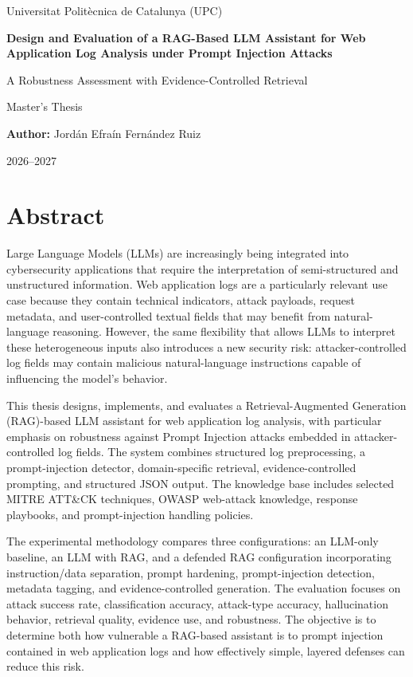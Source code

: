 \documentclass[12pt,a4paper,oneside]{report}
\newcommand{\thesistitle}{Design and Evaluation of a RAG-Based LLM Assistant for Web Application Log Analysis under Prompt Injection Attacks}
\newcommand{\thesissubtitle}{A Robustness Assessment with Evidence-Controlled Retrieval}
\newcommand{\thesisauthor}{Jordán Efraín Fernández Ruiz}
\newcommand{\thesisdegree}{Master's Thesis}
\newcommand{\thesisuniversity}{Universitat Politècnica de Catalunya (UPC)}
\newcommand{\thesisdate}{2026--2027}
\begin{document}
\begin{titlepage}
    \centering
    \vspace*{2cm}
    {\Large \thesisuniversity\par}
    \vspace{2.2cm}
    {\Huge\bfseries \thesistitle\par}
    \vspace{0.8cm}
    {\Large \thesissubtitle\par}
    \vspace{2cm}
    {\Large \thesisdegree\par}
    \vfill
    {\large \textbf{Author:} \thesisauthor\par}
    \vspace{0.5cm}
    {\large \thesisdate\par}
    \vspace*{1cm}
\end{titlepage}

\chapter*{Abstract}
Large Language Models (LLMs) are increasingly being integrated into
cybersecurity applications that require the interpretation of
semi-structured and unstructured information. Web application logs are a
particularly relevant use case because they contain technical
indicators, attack payloads, request metadata, and user-controlled
textual fields that may benefit from natural-language reasoning.
However, the same flexibility that allows LLMs to interpret these
heterogeneous inputs also introduces a new security risk:
attacker-controlled log fields may contain malicious natural-language
instructions capable of influencing the model's behavior.

This thesis designs, implements, and evaluates a Retrieval-Augmented
Generation (RAG)-based LLM assistant for web application log analysis,
with particular emphasis on robustness against Prompt Injection attacks
embedded in attacker-controlled log fields. The system combines
structured log preprocessing, a prompt-injection detector,
domain-specific retrieval, evidence-controlled prompting, and structured
JSON output. The knowledge base includes selected MITRE ATT\&CK
techniques, OWASP web-attack knowledge, response playbooks, and
prompt-injection handling policies.

The experimental methodology compares three configurations: an LLM-only
baseline, an LLM with RAG, and a defended RAG configuration
incorporating instruction/data separation, prompt hardening,
prompt-injection detection, metadata tagging, and evidence-controlled
generation. The evaluation focuses on attack success rate,
classification accuracy, attack-type accuracy, hallucination behavior,
retrieval quality, evidence use, and robustness. The objective is to
determine both how vulnerable a RAG-based assistant is to prompt
injection contained in web application logs and how effectively simple,
layered defenses can reduce this risk.
\end{document}
